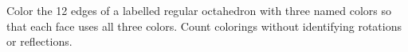 Color the 12 edges of a labelled regular octahedron with three named colors so that each face uses all three colors. Count colorings without identifying rotations or reflections.
